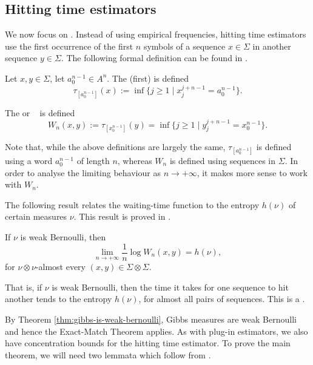 \subsection{Hitting time estimators}\label{ssec:hitting-times}
We now focus on . Instead of using empirical frequencies, hitting time estimators use the first occurrence of the first $n$ symbols of a sequence $x \in \Sigma$ in another sequence $y \in \Sigma$. The following formal definition can be found in \cite[Definition 2.1]{chazottes-ugalde:hitting-times}.

\begin{definition}
	Let $x, y \in \Sigma$, let $a_0^{n - 1} \in A^n$. The (first)  is defined
	\[
		\tau_{[a_0^{n - 1}]}(x) := \inf\{j \geq 1 \mid x_j^{j + n - 1} = a_0^{n - 1}\}.
	\]
	
	The  or ~\cite[Section III.5]{shields:ergodic} is defined
	\[
		W_n(x, y) := \tau_{[x_0^{n - 1}]}(y) = \inf\{j \geq 1 \mid y_j^{j + n - 1} = x_0^{n - 1}\}.
	\]
\end{definition}

Note that, while the above definitions are largely the same, $\tau_{[a_0^{n - 1}]}$ is defined using a word $a_0^{n - 1}$ of length $n$, whereas $W_n$ is defined using sequences in $\Sigma$. In order to analyse the limiting behaviour as $n \to +\infty$, it makes more sense to work with $W_n$.

The following result relates the waiting-time function to the entropy $h(\nu)$ of certain measures $\nu$. This result is proved in \cite[Theorem III.5.1]{shields:ergodic}.

\begin{theorem} \label{thm:exact-match}
	If $\nu$ is weak Bernoulli, then
	\[
		\lim_{n \to +\infty}{\frac{1}{n}\log{W_n(x, y)}} = h(\nu),
	\]
	for $\nu \otimes \nu$-almost every $(x, y) \in \Sigma \otimes \Sigma$.
\end{theorem}

That is, if $\nu$ is weak Bernoulli, then the time it takes for one sequence to hit another tends to the entropy $h(\nu)$, for almost all pairs of sequences. This is a .

By Theorem \ref{thm:gibbs-is-weak-bernoulli}, Gibbs measures are weak Bernoulli and hence the Exact-Match Theorem applies. As with plug-in estimators, we also have concentration bounds for the hitting time estimator. To prove the main theorem, we will need two lemmata which follow from \cite[Theorem 1]{abadi:sharp}.

